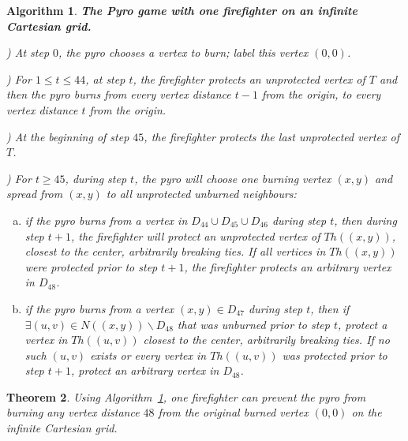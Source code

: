 \documentclass[12pt]{article}
\newtheorem{theorem}{Theorem}
\newtheorem{algorithm}[theorem]{Algorithm}
\begin{document}
\begin{algorithm}\label{alg:Cart}{\bf The Pyro game with one firefighter on an infinite Cartesian grid.}\medskip

) At step $0$, the pyro chooses a vertex to burn; label this vertex $(0,0)$.\medskip

) For $1 \leq t \leq 44$, at step $t$, the firefighter protects an unprotected vertex of $T$ and then the pyro burns from every vertex distance $t-1$ from the origin, to every vertex distance $t$ from the origin.\medskip

) At the beginning of step $45$, the firefighter protects the last unprotected vertex of $T$.\medskip

) For $t \geq 45$, during step $t$, the pyro will choose one burning vertex $(x,y)$ and spread from $(x,y)$ to all unprotected unburned neighbours:

\begin{enumerate}[a)] \item if the pyro burns from a vertex in $D_{44}\cup D_{45}\cup D_{46}$ during step $t$, then during step $t+1$, the firefighter will protect an unprotected vertex of $Th((x,y))$, closest to the center, arbitrarily breaking ties.  If all vertices in $Th((x,y))$ were protected prior to step $t+1$, the firefighter protects an arbitrary vertex in $D_{48}$.\medskip

\item if the pyro burns from a vertex $(x,y) \in D_{47}$ during step $t$, then if~ $\exists (u,v) \in N((x,y))\backslash D_{48}$ that was unburned prior to step $t$, protect a vertex in $Th((u,v))$ closest to the center, arbitrarily breaking ties.  If no such $(u,v)$ exists or every vertex in $Th((u,v))$ was protected prior to step $t+1$, protect an arbitrary vertex in $D_{48}$.\end{enumerate}\end{algorithm}

\begin{theorem}Using Algorithm~\ref{alg:Cart}, one firefighter can prevent the pyro from burning any vertex distance $48$ from the original burned vertex $(0,0)$ on the infinite Cartesian grid.\end{theorem}
\end{document}
